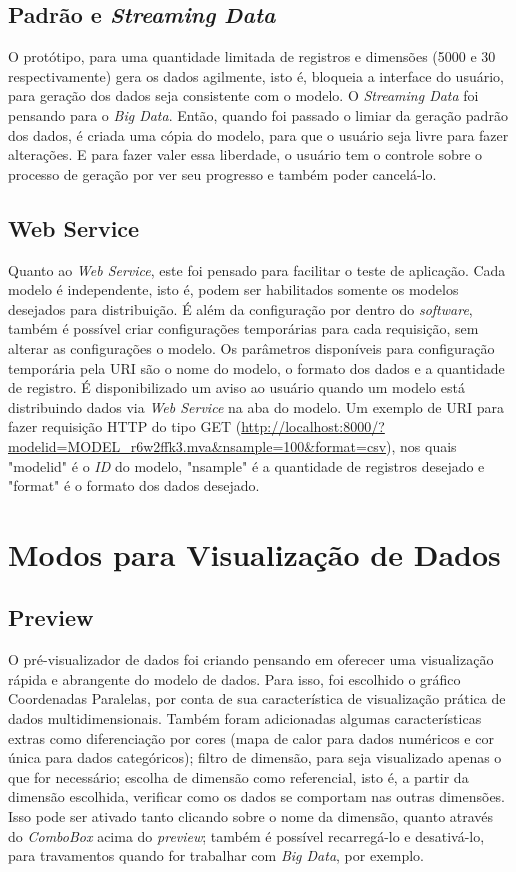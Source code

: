 \documentclass[
	12pt,				%
	openright,			%
	twoside,			%
	a4paper,			%
	english,			%
	brazil				%
	]{abntex2}
\begin{document}
		\subsection{Padrão e \emph{Streaming Data}}
		O protótipo, para uma quantidade limitada de registros e dimensões (5000 e 30 respectivamente) gera os dados agilmente, isto é, bloqueia a interface do usuário, para geração dos dados seja consistente com o modelo.
		O \emph{Streaming Data} foi pensando para o \emph{Big Data}. Então, quando foi passado o limiar da geração padrão dos dados, é criada uma cópia do modelo, para que o usuário seja livre para fazer alterações.
		E para fazer valer essa liberdade, o usuário tem o controle sobre o processo de geração por ver seu progresso e também poder cancelá-lo.
		\subsection{Web Service}
		Quanto ao \emph{Web Service}, este foi pensado para facilitar o teste de aplicação.
		Cada modelo é independente, isto é, podem ser habilitados somente os modelos desejados para distribuição.
		É além da configuração por dentro do \emph{software}, também é possível criar configurações temporárias para cada requisição, sem alterar as configurações o modelo.
		Os parâmetros disponíveis para configuração temporária pela URI são o nome do modelo, o formato dos dados e a quantidade de registro.
		É disponibilizado um aviso ao usuário quando um modelo está distribuindo dados via \emph{Web Service} na aba do modelo.
		Um exemplo de URI para fazer requisição HTTP do tipo GET (\url{http://localhost:8000/?modelid=MODEL_r6w2ffk3.mva&nsample=100&format=csv}), nos quais "modelid" é o \emph{ID} do modelo, "nsample" é a quantidade de registros desejado e "format" é o formato dos dados desejado.
	 
	\section{Modos para Visualização de Dados}

		\subsection{Preview}
		O pré-visualizador de dados foi criando pensando em oferecer uma visualização rápida e abrangente do modelo de dados.
		Para isso, foi escolhido o gráfico Coordenadas Paralelas, por conta de sua característica de visualização prática de dados multidimensionais.
		Também foram adicionadas algumas características extras como diferenciação por cores (mapa de calor para dados numéricos e cor única para dados categóricos); 
			filtro de dimensão, para seja visualizado apenas o que for necessário;
			escolha de dimensão como referencial, isto é, a partir da dimensão escolhida, verificar como os dados se comportam nas outras dimensões. Isso pode ser ativado tanto clicando sobre o nome da dimensão, quanto através do \emph{ComboBox} acima do \emph{preview};
			também é possível recarregá-lo e desativá-lo, para travamentos quando for trabalhar com \emph{Big Data}, por exemplo.
\end{document}
